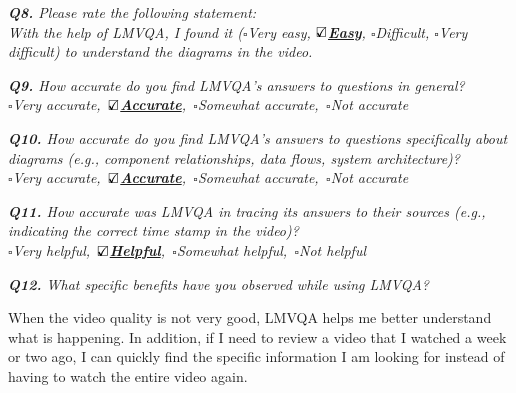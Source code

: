 \vspace*{1em}\noindent\textit{\textbf{Q8.} Please rate the following statement:
\\[.5em]
 \textit{With the help of LMVQA, I found it}
($\square$Very easy, \underline{\bfseries$\text{\rlap{$\checkmark$}}\square$Easy}, $\square$Difficult, $\square$Very difficult)
to understand the diagrams in the video.
}


\vspace*{1em}\noindent\textit{\textbf{Q9.} How accurate do you find LMVQA's answers to questions in general?
\\[.5em]
        \indent$\square$Very accurate,\,
        \underline{\bfseries$\text{\rlap{$\checkmark$}}\square$Accurate},\,
        $\square$Somewhat accurate,\,
        $\square$Not accurate
}



\vspace*{1em}\noindent\textit{\textbf{Q10.} How accurate do you find LMVQA's answers to questions specifically about diagrams (e.g., component relationships, data flows, system architecture)?
\\[.5em]
        \indent$\square$Very accurate,\,
        \underline{\bfseries$\text{\rlap{$\checkmark$}}\square$Accurate},\,
        $\square$Somewhat accurate,\,
        $\square$Not accurate
}



\vspace*{1em}\noindent\textit{\textbf{Q11.} 
How accurate was LMVQA in tracing its answers to their sources
(e.g.,  indicating the correct time stamp in the video)?
\\[.5em]
\indent $\square$Very helpful,\,
\underline{\bfseries$\text{\rlap{$\checkmark$}}\square$Helpful},\,
$\square$Somewhat helpful,\,
$\square$Not helpful
}


\vspace*{1em}\noindent\textit{\textbf{Q12.} What specific benefits have you observed while using LMVQA?
}
\begin{samepage}
\begin{mdframed}[style=MyFrame]
When the video quality is not very good, LMVQA helps me better understand what is happening. In addition, if I need to review a video that I watched a week or two ago, I can quickly find the specific information I am looking for instead of having to watch the entire video again.
\end{mdframed}
\end{samepage}

